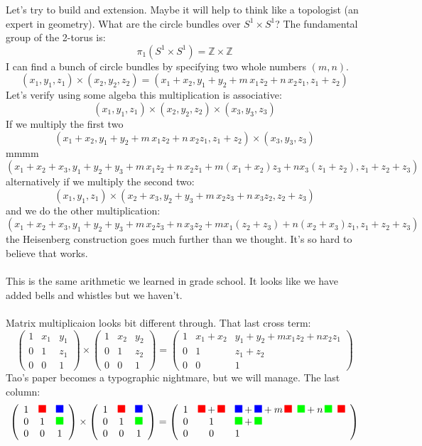 \documentclass[12pt]{article}
\newcommand{\red}{\begin{tikz}[scale=0.25]
\draw[fill=red, color=red] (0,0)--(1,0)--(1,1)--(0,1)--cycle;\end{tikz}}
\newcommand{\blue}{\begin{tikz}[scale=0.25]
\draw[fill=blue, color=blue] (0,0)--(1,0)--(1,1)--(0,1)--cycle;\end{tikz}}
\newcommand{\green}{\begin{tikz}[scale=0.25]
\draw[fill=green, color=green] (0,0)--(1,0)--(1,1)--(0,1)--cycle;\end{tikz}}
\begin{document}
\noindent Let's try to build and extension.  Maybe it will help to think like a topologist (an expert in geometry).  What are the circle bundles over $S^1 \times S^1 $?  The fundamental group of the 2-torus is:
$$  \pi_1 ( S^1 \times S^1 ) = \mathbb{Z} \times \mathbb{Z} $$
I can find a bunch of circle bundles by specifying two whole numbers $(m,n)$.
$$ (x_1, y_1, z_1) \times (x_2, y_2, z_2) 
= (x_1 + x_2, y_1 + y_2 + m \, x_1 z_2 + n \, x_2 z_1, z_1 + z_2)$$
Let's verify using some algeba this multiplication is associative:
$$ (x_1, y_1, z_1) \times (x_2, y_2, z_2)  \times (x_3, y_3, z_3) $$
If we multiply the first two
$$ (x_1 + x_2, y_1 + y_2 + m \, x_1 z_2 + n \, x_2 z_1, z_1 + z_2) \times (x_3, y_3, z_3) $$
mmmm
$$  (x_1 + x_2 + x_3, y_1 + y_2 +y_3   + m \, x_1 z_2 + n \, x_2 z_1
+ m (x_1 + x_2)z_3 + n x_3 (z_1 + z_2)  , z_1 + z_2+ z_3) $$
alternatively if we multiply the second two:
$$  (x_1, y_1, z_1) \times (x_2 + x_3, y_2 + y_3 + m \, x_2 z_3 + n \, x_3 z_2, z_2 + z_3) $$
and we do the other multiplication:
$$  (x_1 + x_2 + x_3, y_1 + y_2 +y_3   + m \, x_2 z_3 + n \, x_3 z_2
+ m x_1 (z_2 + z_3) + n (x_2 + x_3)z_1  , z_1 + z_2+ z_3) $$
the Heisenberg construction goes much further than we thought.  It's so hard to believe that works. \\ \\
This is the same arithmetic we learned in grade school.  It looks like we have added bells and whistles but we haven't. \\ \\
Matrix multiplicaion looks  bit different through.  That last cross term:
$$  \left(\begin{array}{ccc} 1 & x_1 & y_1 \\ 
0 & 1 & z_1 \\ 
0 & 0 & 1 \end{array}\right)
\times 
\left(\begin{array}{ccc} 1 & x_2 & y_2 \\ 
0 & 1 & z_2 \\ 
0 & 0 & 1 \end{array}\right) = 
\left(\begin{array}{ccl} 1 & x_1 +x_2 & y_1 + y_2 + mx_1z_2 + n x_2z_1 \\ 
0 & 1 & z_1 +z_2 \\ 
0 & 0 & 1 \end{array}\right)$$
Tao's paper becomes a typographic nightmare, but we will manage.  The last column:
$$  \left(\begin{array}{ccc} 1 & \red  & \blue \\ 
0 & 1 & \green \\ 
0 & 0 & 1 \end{array}\right)
\times 
\left(\begin{array}{ccc} 1 & \red  & \blue \\ 
0 & 1 & \green \\ 
0 & 0 & 1 \end{array}\right) = 
\left(\begin{array}{ccl} 1 & \red + \red & \blue + \blue + m \, \red \;\; \green + n \,\green \;\; \red \\ 
0 & 1 & \green + \green \\ 
0 & 0 & 1 \end{array}\right)$$
\end{document}
